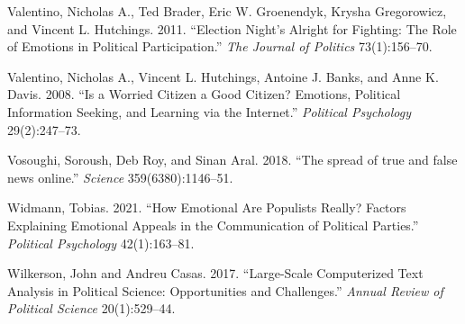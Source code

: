 \documentclass[
  12pt,
]{article}
\begin{document}
\leavevmode\hypertarget{ref-valentino2011election}{}%
Valentino, Nicholas A., Ted Brader, Eric W. Groenendyk, Krysha Gregorowicz, and Vincent L. Hutchings. 2011. ``Election Night's Alright for Fighting: The Role of Emotions in Political Participation.'' \emph{The Journal of Politics} 73(1):156--70.

\leavevmode\hypertarget{ref-valentino2008worried}{}%
Valentino, Nicholas A., Vincent L. Hutchings, Antoine J. Banks, and Anne K. Davis. 2008. ``Is a Worried Citizen a Good Citizen? Emotions, Political Information Seeking, and Learning via the Internet.'' \emph{Political Psychology} 29(2):247--73.

\leavevmode\hypertarget{ref-vosoughi2018spread}{}%
Vosoughi, Soroush, Deb Roy, and Sinan Aral. 2018. ``The spread of true and false news online.'' \emph{Science} 359(6380):1146--51.

\leavevmode\hypertarget{ref-widmann2021how}{}%
Widmann, Tobias. 2021. ``How Emotional Are Populists Really? Factors Explaining Emotional Appeals in the Communication of Political Parties.'' \emph{Political Psychology} 42(1):163--81.

\leavevmode\hypertarget{ref-wilkerson2017large}{}%
Wilkerson, John and Andreu Casas. 2017. ``Large-Scale Computerized Text Analysis in Political Science: Opportunities and Challenges.'' \emph{Annual Review of Political Science} 20(1):529--44.
\end{document}
